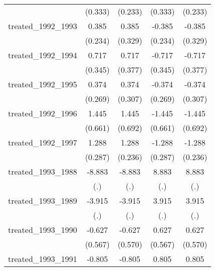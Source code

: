 {\begin{tabular}{l*{4}{c}}
            &     (0.333)         &     (0.233)         &     (0.333)         &     (0.233)         \\
[1em]
treated\_1992\_1993&       0.385         &       0.385         &      -0.385         &      -0.385         \\
            &     (0.234)         &     (0.329)         &     (0.234)         &     (0.329)         \\
[1em]
treated\_1992\_1994&       0.717\sym{*}  &       0.717         &      -0.717\sym{*}  &      -0.717         \\
            &     (0.345)         &     (0.377)         &     (0.345)         &     (0.377)         \\
[1em]
treated\_1992\_1995&       0.374         &       0.374         &      -0.374         &      -0.374         \\
            &     (0.269)         &     (0.307)         &     (0.269)         &     (0.307)         \\
[1em]
treated\_1992\_1996&       1.445\sym{*}  &       1.445\sym{*}  &      -1.445\sym{*}  &      -1.445\sym{*}  \\
            &     (0.661)         &     (0.692)         &     (0.661)         &     (0.692)         \\
[1em]
treated\_1992\_1997&       1.288\sym{***}&       1.288\sym{***}&      -1.288\sym{***}&      -1.288\sym{***}\\
            &     (0.287)         &     (0.236)         &     (0.287)         &     (0.236)         \\
[1em]
treated\_1993\_1988&      -8.883         &      -8.883         &       8.883         &       8.883         \\
            &         (.)         &         (.)         &         (.)         &         (.)         \\
[1em]
treated\_1993\_1989&      -3.915         &      -3.915         &       3.915         &       3.915         \\
            &         (.)         &         (.)         &         (.)         &         (.)         \\
[1em]
treated\_1993\_1990&      -0.627         &      -0.627         &       0.627         &       0.627         \\
            &     (0.567)         &     (0.570)         &     (0.567)         &     (0.570)         \\
[1em]
treated\_1993\_1991&      -0.805         &      -0.805         &       0.805         &       0.805         \\

\end{tabular}}
